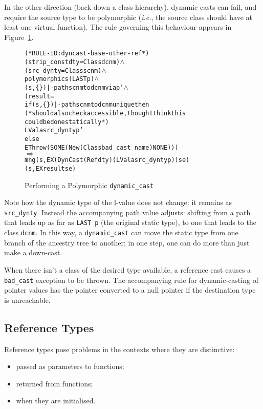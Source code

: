 \documentclass[11pt]{article}
\newcommand{\ie}{\emph{i.e.}}
\newcommand{\lbr}{\texttt{\{}}
\newcommand{\rbr}{\texttt{\}}}
\begin{document}
In the other direction (back down a class hierarchy), dynamic casts
can fail, and require the source type to be polymorphic (\ie, the
source class should have at least one virtual function).  The rule
governing this behaviour appears in
Figure~\ref{fig:dyncast-base-other-ref}.
\begin{figure}[htbp]
\begin{center}
\begin{minipage}{\textwidth}
%
\begin{alltt}
(* RULE-ID: dyncast-base-other-ref *)
     (strip_const dty = Class dcnm) \(\land\)
     (src_dynty = Class scnm) \(\land\)
     polymorphic s (LAST p) \(\land\)
     (s,\lbr\rbr) |- path scnm to dcnm via p' \(\land\)
     (result =
      if (s,\lbr\rbr) |- path scnm to dcnm unique then
        (* should also check accessible, though I think this
           could be done statically *)
        LVal a src_dynty p'
      else
        EThrow (SOME (New (Class bad_cast_name) NONE)))
   \(\Rightarrow\)
     mng (s, EX (DynCast (Ref dty) (LVal a src_dynty p)) se)
         (s, EX result se)
\end{alltt}
\end{minipage}
\end{center}
\caption{Performing a Polymorphic \texttt{dynamic_cast}}
\label{fig:dyncast-base-other-ref}
\end{figure}
Note how the dynamic type of the l-value does not change: it remains
as \texttt{src_dynty}.  Instead the accompanying path value adjusts:
shifting from a path that leads up as far as \texttt{LAST~p} (the
original static type), to one that leads to the class \texttt{dcnm}.
In this way, a \texttt{dynamic_cast} can move the static type from one
branch of the ancestry tree to another; in one step, one can do more
than just make a down-cast.

When there isn't a class of the desired type available, a reference
cast causes a \texttt{bad_cast} exception to be thrown.  The
accompanying rule for dynamic-casting of pointer values has the
pointer converted to a null pointer if the destination type is unreachable.


\subsection{Reference Types}
\label{sec:reftypes}

Reference types pose problems in the contexts where they are
distinctive:
\begin{itemize}
\item passed as parameters to functions;
\item returned from functions;
\item when they are initialised.
\end{itemize}
\end{document}
